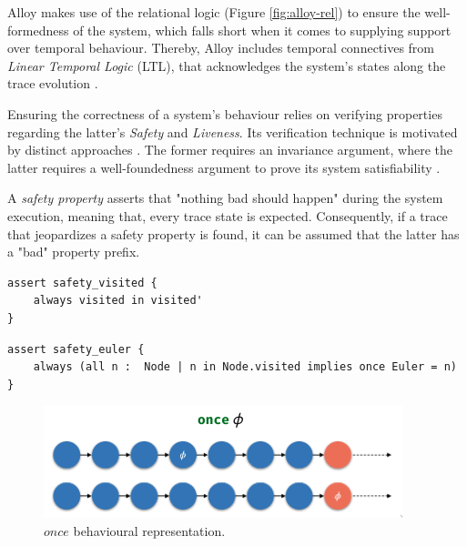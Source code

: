 Alloy makes use of the relational logic (Figure \ref{fig:alloy-rel}) to ensure the well-formedness of the system, which falls short when it comes to supplying support over temporal behaviour. Thereby, Alloy includes temporal connectives from \textit{Linear Temporal Logic} (LTL), that acknowledges the system's states along the trace evolution \cite{lwspecification, alloy-6, 9341085}.

Ensuring the correctness of a system's behaviour relies on verifying properties regarding the latter's \textit{Safety} and \textit{Liveness}. Its verification technique is motivated by distinct approaches \cite{kindler1994safety}. The former requires an invariance argument, where the latter requires a well-foundedness argument to prove its system satisfiability \cite{alpern1987recognizing}.

A \textit{safety property} asserts that "nothing bad should happen" during the system execution, meaning that, every trace state is expected. Consequently, if a trace that jeopardizes a safety property is found, it can be assumed that the latter has a "bad" property prefix. 

\begin{lstlisting}[title={\textit{Safety Property}: The relation visited can only evolve through time.}, otherkeywords = {always, assert, module, set, fact, iden, no, in, \=, \*, \+, \~, \-\>, \&, '}, floatplacement=H]
assert safety_visited {
    always visited in visited'
} 
\end{lstlisting}

\begin{lstlisting}[title={\textit{Safety Property}: If a node is visited, then once \textit{Euler} was 'inside' it.}, otherkeywords = {always, assert, module, set, fact, iden, no, in, \=, \*, \+, \~, \-\>, \&, all, \:, \., implies, once}, floatplacement=H]
assert safety_euler {
    always (all n :  Node | n in Node.visited implies once Euler = n)
} 
\end{lstlisting}

\begin{figure}[H]
    \centering
    \includegraphics[width=0.6\linewidth]{images/alloy_once.png}
    \caption{$once$ behavioural representation.}
    \label{fig:alloy-once}
\end{figure}

